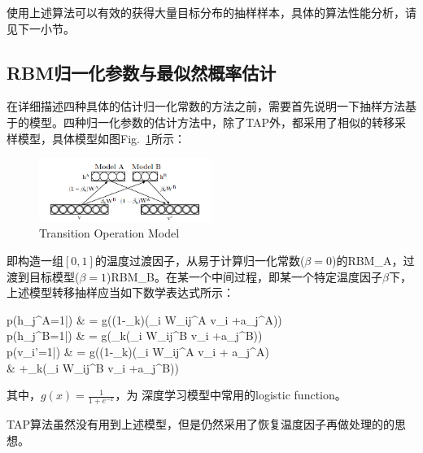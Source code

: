 \documentclass[journal,a4paper]{IEEEtran}
\begin{document}
	使用上述算法可以有效的获得大量目标分布的抽样样本，具体的算法性能分析，请见下一小节。

	\subsection{RBM归一化参数与最似然概率估计}

	在详细描述四种具体的估计归一化常数的方法之前，需要首先说明一下抽样方法基于的模型。四种归一化参数的估计方法中，除了TAP外，都采用了相似的转移采样模型，具体模型如图Fig.~\ref{fig2}所示：
	\begin{figure}[h]
		\includegraphics[width = 0.5\textwidth]{2.jpg}
		\caption{Transition Operation Model}
		\label{fig2}
	\end{figure}
	
	即构造一组$[0,1]$的温度过渡因子，从易于计算归一化常数($\beta = 0$)的RBM\_A，过渡到目标模型($\beta = 1$)RBM\_B。在某一个中间过程，即某一个特定温度因子$\beta$下，上述模型转移抽样应当如下数学表达式所示：
	\begin{flalign}
	p(h_j^A=1|) & = g\left((1-\beta_k)\left(\sum_i W_{ij}^A v_i +a_j^A\right)\right) \\
	\label{equ3}
	p(h_j^B=1|) & = g\left(\beta_k\left(\sum_i W_{ij}^B v_i +a_j^B\right)\right) \\
	\label{equ4}
	p(v_i'=1|) & = g((1-\beta_k)(\sum_i W_{ij}^A v_i + a_j^A) \\
	 & +\beta_k(\sum_i W_{ij}^B v_i +a_j^B))
    \label{equ5}
	\end{flalign}
	其中，$g(x)=\frac{1}{1+e^{-x}}$，为 深度学习模型中常用的logistic function。
	
	TAP算法虽然没有用到上述模型，但是仍然采用了恢复温度因子再做处理的的思想。
\end{document}
